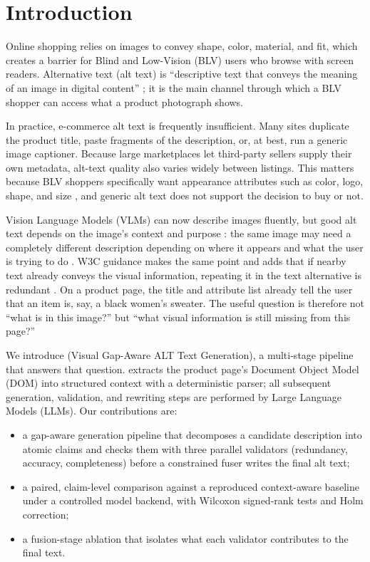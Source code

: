 \section{Introduction}
Online shopping relies on images to convey shape, color, material, and fit, which creates a barrier for Blind and Low-Vision (BLV) users who browse with screen readers. Alternative text (alt text) is ``descriptive text that conveys the meaning of an image in digital content'' \cite{whatalttext}; it is the main channel through which a BLV shopper can access what a product photograph shows.

In practice, e-commerce alt text is frequently insufficient. Many sites duplicate the product title, paste fragments of the description, or, at best, run a generic image captioner. Because large marketplaces let third-party sellers supply their own metadata, alt-text quality also varies widely between listings. This matters because BLV shoppers specifically want appearance attributes such as color, logo, shape, and size \cite{wang2021}, and generic alt text does not support the decision to buy or not.

Vision Language Models (VLMs) can now describe images fluently, but good alt text depends on the image's context and purpose \cite{nngroup2024}: the same image may need a completely different description depending on where it appears and what the user is trying to do \cite{stangl2021}. W3C guidance makes the same point and adds that if nearby text already conveys the visual information, repeating it in the text alternative is redundant \cite{w3cimages,w3cinformative}. On a product page, the title and attribute list already tell the user that an item is, say, a black women's sweater. The useful question is therefore not ``what is in this image?'' but ``what visual information is still missing from this page?''

We introduce \sys (Visual Gap-Aware ALT Text Generation), a multi-stage pipeline that answers that question. \sys extracts the product page's Document Object Model (DOM) into structured context with a deterministic parser; all subsequent generation, validation, and rewriting steps are performed by Large Language Models (LLMs). Our contributions are:
\begin{itemize}
\item a gap-aware generation pipeline that decomposes a candidate description into atomic claims and checks them with three parallel validators (redundancy, accuracy, completeness) before a constrained fuser writes the final alt text;
\item a paired, claim-level comparison against a reproduced context-aware baseline \cite{mohanbabu2024} under a controlled model backend, with Wilcoxon signed-rank tests and Holm correction;
\item a fusion-stage ablation that isolates what each validator contributes to the final text.
\end{itemize}

